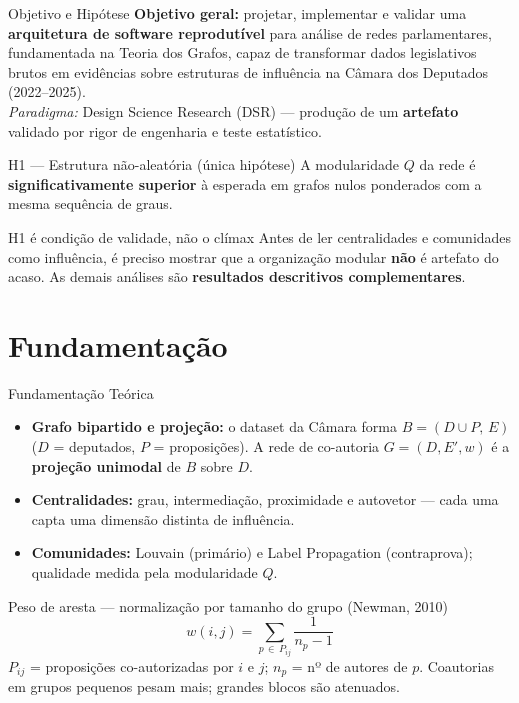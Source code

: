 \documentclass{beamer}
\begin{document}
\begin{frame}{Objetivo e Hipótese}
\textbf{Objetivo geral:} projetar, implementar e validar uma \textbf{arquitetura de software reprodutível} para análise de redes parlamentares, fundamentada na Teoria dos Grafos, capaz de transformar dados legislativos brutos em evidências sobre estruturas de influência na Câmara dos Deputados (2022--2025). \\
\footnotesize \textit{Paradigma:} Design Science Research (DSR) — produção de um \textbf{artefato} validado por rigor de engenharia e teste estatístico. \normalsize

\vspace{0.2cm}
\begin{block}{H1 — Estrutura não-aleatória (única hipótese)}
A modularidade $Q$ da rede é \textbf{significativamente superior} à esperada em grafos nulos ponderados com a mesma sequência de graus.
\end{block}
\begin{alertblock}{H1 é condição de validade, não o clímax}
Antes de ler centralidades e comunidades como influência, é preciso mostrar que a organização modular \textbf{não} é artefato do acaso. As demais análises são \textbf{resultados descritivos complementares}.
\end{alertblock}
\end{frame}

\section{Fundamentação}

\begin{frame}{Fundamentação Teórica}
\begin{itemize}
  \item \textbf{Grafo bipartido e projeção:} o dataset da Câmara forma $B = (D \cup P,\, E)$ ($D$ = deputados, $P$ = proposições). A rede de co-autoria $G = (D, E', w)$ é a \textbf{projeção unimodal} de $B$ sobre $D$.
  \item \textbf{Centralidades:} grau, intermediação, proximidade e autovetor — cada uma capta uma dimensão distinta de influência.
  \item \textbf{Comunidades:} Louvain (primário) e Label Propagation (contraprova); qualidade medida pela modularidade $Q$.
\end{itemize}

\vspace{0.2cm}
\begin{block}{Peso de aresta — normalização por tamanho do grupo (Newman, 2010)}
\[
  w(i,j) = \sum_{p \,\in\, P_{ij}} \frac{1}{n_p - 1}
\]
\footnotesize $P_{ij}$ = proposições co-autorizadas por $i$ e $j$; \; $n_p$ = nº de autores de $p$. Coautorias em grupos pequenos pesam mais; grandes blocos são atenuados. \normalsize
\end{block}
\end{frame}
\end{document}
